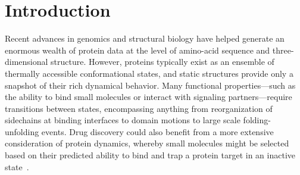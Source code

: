 \documentclass[aps,prl,preprint,nofootinbib,superscriptaddress,linenumbers]{revtex4-1}
\begin{document}
\maketitle

\section{Introduction}
\label{section:introduction}

Recent advances in genomics and structural biology have helped generate an enormous wealth of protein data at the level of amino-acid sequence and three-dimensional structure.
However, proteins typically exist as an ensemble of thermally accessible conformational states, and static structures provide only a snapshot of their rich dynamical behavior.
Many functional properties---such as the ability to bind small molecules or interact with signaling partners---require transitions between states, encompassing anything from reorganization of sidechains at binding interfaces to domain motions to large scale folding-unfolding events.
Drug discovery could also benefit from a more extensive consideration of protein dynamics, whereby small molecules might be selected based on their predicted ability to bind and trap a protein target in an inactive state~\cite{craik:science:2009:trapping-moving-targets}.
\end{document}
